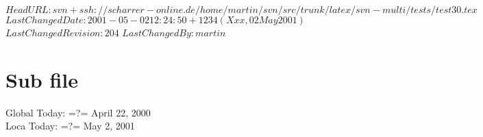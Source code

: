 \svnidlong
{$HeadURL: svn+ssh://scharrer-online.de/home/martin/svn/src/trunk/latex/svn-multi/tests/test30.tex $}
{$LastChangedDate: 2001-05-02 12:24:50 +1234 (Xxx, 02 May 2001) $}
{$LastChangedRevision: 204 $}
{$LastChangedBy: martin $}


\section{Sub file}
\noindent
Global Today: \svntoday =?= April 22, 2000\\
Loca Today: \svnfiletoday =?= May 2, 2001\\

